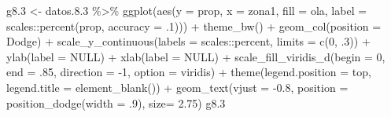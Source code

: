 \documentclass[
  12pt,
]{book}
\newenvironment{Shaded}{\begin{snugshade}}{\end{snugshade}}
\newcommand{\AttributeTok}[1]{\textcolor[rgb]{0.77,0.63,0.00}{#1}}
\newcommand{\ConstantTok}[1]{\textcolor[rgb]{0.00,0.00,0.00}{#1}}
\newcommand{\DecValTok}[1]{\textcolor[rgb]{0.00,0.00,0.81}{#1}}
\newcommand{\FloatTok}[1]{\textcolor[rgb]{0.00,0.00,0.81}{#1}}
\newcommand{\FunctionTok}[1]{\textcolor[rgb]{0.00,0.00,0.00}{#1}}
\newcommand{\NormalTok}[1]{#1}
\newcommand{\OtherTok}[1]{\textcolor[rgb]{0.56,0.35,0.01}{#1}}
\newcommand{\SpecialCharTok}[1]{\textcolor[rgb]{0.00,0.00,0.00}{#1}}
\newcommand{\StringTok}[1]{\textcolor[rgb]{0.31,0.60,0.02}{#1}}
\begin{document}
\begin{Shaded}
\begin{Highlighting}[]
\NormalTok{g8}\FloatTok{.3} \OtherTok{\textless{}{-}}\NormalTok{ datos.}\FloatTok{8.3} \SpecialCharTok{\%\textgreater{}\%} 
  \FunctionTok{ggplot}\NormalTok{(}\FunctionTok{aes}\NormalTok{(}\AttributeTok{y =}\NormalTok{ prop, }\AttributeTok{x =}\NormalTok{ zona1, }\AttributeTok{fill =}\NormalTok{ ola, }
             \AttributeTok{label =}\NormalTok{ scales}\SpecialCharTok{::}\FunctionTok{percent}\NormalTok{(prop, }\AttributeTok{accuracy =}\NormalTok{ .}\DecValTok{1}\NormalTok{))) }\SpecialCharTok{+} 
  \FunctionTok{theme\_bw}\NormalTok{() }\SpecialCharTok{+} 
  \FunctionTok{geom\_col}\NormalTok{(}\AttributeTok{position =} \StringTok{\textquotesingle{}Dodge\textquotesingle{}}\NormalTok{) }\SpecialCharTok{+}
  \FunctionTok{scale\_y\_continuous}\NormalTok{(}\AttributeTok{labels =}\NormalTok{ scales}\SpecialCharTok{::}\NormalTok{percent,}
                     \AttributeTok{limits =} \FunctionTok{c}\NormalTok{(}\DecValTok{0}\NormalTok{, .}\DecValTok{3}\NormalTok{)) }\SpecialCharTok{+}
  \FunctionTok{ylab}\NormalTok{(}\AttributeTok{label =} \ConstantTok{NULL}\NormalTok{) }\SpecialCharTok{+}
  \FunctionTok{xlab}\NormalTok{(}\AttributeTok{label =} \ConstantTok{NULL}\NormalTok{) }\SpecialCharTok{+}
  \FunctionTok{scale\_fill\_viridis\_d}\NormalTok{(}\AttributeTok{begin =} \DecValTok{0}\NormalTok{, }\AttributeTok{end =}\NormalTok{ .}\DecValTok{85}\NormalTok{, }\AttributeTok{direction =} \SpecialCharTok{{-}}\DecValTok{1}\NormalTok{, }\AttributeTok{option =} \StringTok{\textquotesingle{}viridis\textquotesingle{}}\NormalTok{) }\SpecialCharTok{+}
  \FunctionTok{theme}\NormalTok{(}\AttributeTok{legend.position =} \StringTok{\textquotesingle{}top\textquotesingle{}}\NormalTok{,}
        \AttributeTok{legend.title =} \FunctionTok{element\_blank}\NormalTok{()) }\SpecialCharTok{+}
  \FunctionTok{geom\_text}\NormalTok{(}\AttributeTok{vjust =} \SpecialCharTok{{-}}\FloatTok{0.8}\NormalTok{,}
            \AttributeTok{position =} \FunctionTok{position\_dodge}\NormalTok{(}\AttributeTok{width =}\NormalTok{ .}\DecValTok{9}\NormalTok{),}
            \AttributeTok{size=} \FloatTok{2.75}\NormalTok{)}
\NormalTok{g8}\FloatTok{.3}
\end{Highlighting}
\end{Shaded}
\end{document}
